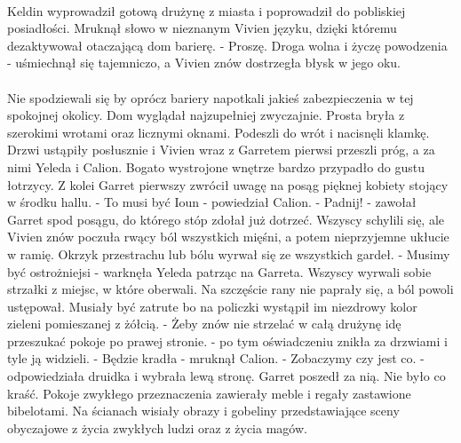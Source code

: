 \documentclass[10pt,twoside,twocolumn]{book}
\begin{document}
\paragraph{}
Keldin wyprowadził gotową drużynę z miasta i poprowadził do pobliskiej posiadłości. 
Mruknął słowo w nieznanym Vivien języku, dzięki któremu dezaktywował otaczającą dom barierę.
\indent - Proszę. Droga wolna i życzę powodzenia - uśmiechnął się tajemniczo, a Vivien znów dostrzegła błysk w jego oku.

\paragraph{}
Nie spodziewali się by oprócz bariery napotkali jakieś zabezpieczenia w tej spokojnej okolicy. 
Dom wyglądał najzupełniej zwyczajnie. 
Prosta bryła z szerokimi wrotami oraz licznymi oknami. 
Podeszli do wrót i nacisnęli klamkę. 
Drzwi ustąpiły posłusznie i Vivien wraz z Garretem pierwsi przeszli próg, a za nimi Yeleda i Calion. 
Bogato wystrojone wnętrze bardzo przypadło do gustu łotrzycy. 
Z kolei Garret pierwszy zwrócił uwagę na posąg pięknej kobiety stojący w środku hallu.
\indent - To musi być Ioun - powiedział Calion.\newline
\indent - Padnij! - zawołał Garret spod posągu, do którego stóp zdołał już dotrzeć. \newline
Wszyscy schylili się, ale Vivien znów poczuła rwący ból wszystkich mięśni, a potem nieprzyjemne ukłucie w ramię. Okrzyk przestrachu lub bólu wyrwał się ze wszystkich gardeł.\newline
\indent - Musimy być ostrożniejsi - warknęła Yeleda patrząc na Garreta. \newline
Wszyscy wyrwali sobie strzałki z miejsc, w które oberwali. Na szczęście rany nie paprały się, a ból powoli ustępował. Musiały być zatrute bo na policzki wystąpił im niezdrowy kolor zieleni pomieszanej z żółcią.\newline
\indent - Żeby znów nie strzelać w całą drużynę idę przeszukać pokoje po prawej stronie. - po tym oświadczeniu znikła za drzwiami i tyle ją widzieli.\newline
\indent - Będzie kradła - mruknął Calion.\newline
\indent - Zobaczymy czy jest co. - odpowiedziała druidka i wybrała lewą stronę. Garret poszedł za nią.\newline
Nie było co kraść. 
Pokoje zwykłego przeznaczenia zawierały meble i regały zastawione bibelotami. 
Na ścianach wisiały obrazy i gobeliny przedstawiające sceny obyczajowe z życia zwykłych ludzi oraz z życia magów. 
\end{document}
